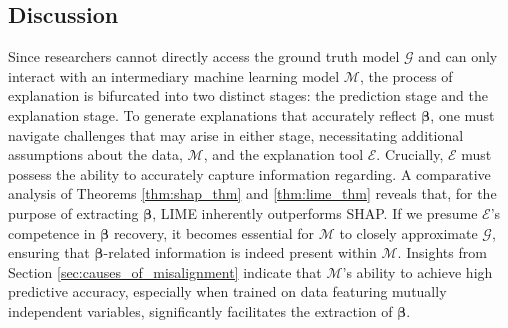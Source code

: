 \documentclass[mnsc,blindrev]{informs3}
\begin{document}
    
    \subsection{Discussion}
            Since researchers cannot directly access the ground truth model $\mathcal{G}$ and can only interact with an intermediary machine learning model $\mathcal{M}$, the process of explanation is bifurcated into two distinct stages: the prediction stage and the explanation stage. To generate explanations that accurately reflect $\boldsymbol{\beta}$, one must navigate challenges that may arise in either stage, necessitating additional assumptions about the data, $\mathcal{M}$, and the explanation tool $\mathcal{E}$. Crucially, $\mathcal{E}$ must possess the ability to accurately capture information regarding. A comparative analysis of Theorems \ref{thm:shap_thm} and \ref{thm:lime_thm} reveals that, for the purpose of extracting $\boldsymbol{\beta}$, LIME inherently outperforms SHAP. If we presume $\mathcal{E}$'s competence in $\boldsymbol{\beta}$ recovery, it becomes essential for $\mathcal{M}$ to closely approximate $\mathcal{G}$, ensuring that $\boldsymbol{\beta}$-related information is indeed present within $\mathcal{M}$. Insights from Section \ref{sec:causes_of_misalignment} indicate that $\mathcal{M}$'s ability to achieve high predictive accuracy, especially when trained on data featuring mutually independent variables, significantly facilitates the extraction of $\boldsymbol{\beta}$.








\end{document}
